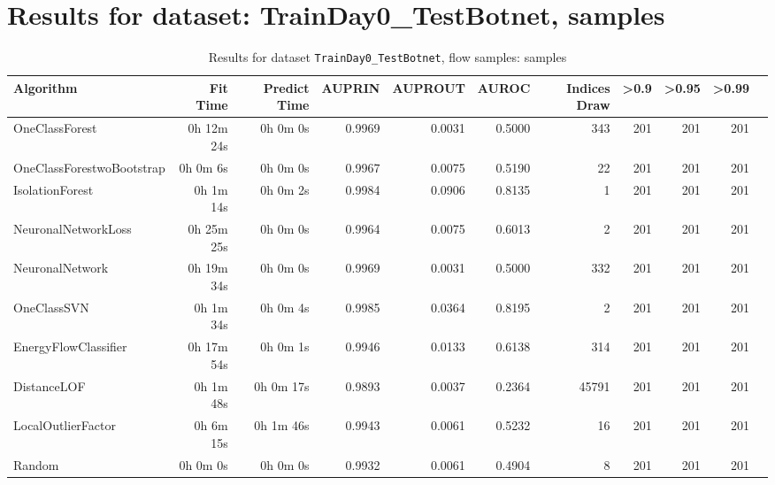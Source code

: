 \documentclass{article}
\begin{document}
\section*{Results for dataset: TrainDay0_TestBotnet, samples}
\begin{table}[h!]
\centering
\caption{Results for dataset \texttt{TrainDay0_TestBotnet}, flow samples: samples}
\label{tab:trainday0testbotnet_samples}
\begin{tabular}{lrrrrrrrrrr}
\toprule
Algorithm & Fit Time & Predict Time & AUPRIN & AUPROUT & AUROC & Indices Draw & >0.9 & >0.95 & >0.99 \\
\midrule
OneClassForest & 0h 12m 24s & 0h 0m 0s & 0.9969 & 0.0031 & 0.5000 & 343 & 201 & 201 & 201 \\
OneClassForestwoBootstrap & 0h 0m 6s & 0h 0m 0s & 0.9967 & 0.0075 & 0.5190 & 22 & 201 & 201 & 201 \\
IsolationForest & 0h 1m 14s & 0h 0m 2s & 0.9984 & 0.0906 & 0.8135 & 1 & 201 & 201 & 201 \\
NeuronalNetworkLoss & 0h 25m 25s & 0h 0m 0s & 0.9964 & 0.0075 & 0.6013 & 2 & 201 & 201 & 201 \\
NeuronalNetwork & 0h 19m 34s & 0h 0m 0s & 0.9969 & 0.0031 & 0.5000 & 332 & 201 & 201 & 201 \\
OneClassSVN & 0h 1m 34s & 0h 0m 4s & 0.9985 & 0.0364 & 0.8195 & 2 & 201 & 201 & 201 \\
EnergyFlowClassifier & 0h 17m 54s & 0h 0m 1s & 0.9946 & 0.0133 & 0.6138 & 314 & 201 & 201 & 201 \\
DistanceLOF & 0h 1m 48s & 0h 0m 17s & 0.9893 & 0.0037 & 0.2364 & 45791 & 201 & 201 & 201 \\
LocalOutlierFactor & 0h 6m 15s & 0h 1m 46s & 0.9943 & 0.0061 & 0.5232 & 16 & 201 & 201 & 201 \\
Random & 0h 0m 0s & 0h 0m 0s & 0.9932 & 0.0061 & 0.4904 & 8 & 201 & 201 & 201 \\
\bottomrule
\end{tabular}
\end{table}
\end{document}
